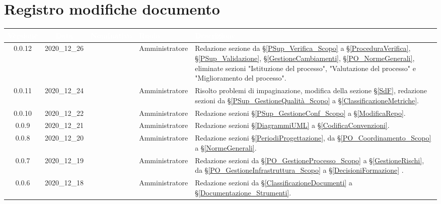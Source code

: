 \section*{Registro modifiche documento}
{
\renewcommand{\arraystretch}{1.5}
\centering
\begin{longtable}{ c c  C{2.3cm} C{3cm} C{3.2cm}}


 \textcolor{white}{\textbf{Versione}}&
    \textcolor{white}{\textbf{Data}}&
    \textcolor{white}{\textbf{Nominativo}}&
    \textcolor{white}{\textbf{Ruolo}}&
    \textcolor{white}{\textbf{Descrizione}}\\	
    \endhead
    
      0.0.12 & 2020\_12\_26 & \TG{}  & Amministratore & Redazione sezione da \S\ref{PSup_Verifica_Scopo} a \S\ref{ProceduraVerifica}, \S\ref{PSup_Validazione}, \S\ref{GestioneCambiamenti}, \S\ref{PO_NormeGenerali}, eliminate sezioni "Istituzione del processo", "Valutazione del processo" e "Miglioramento del processo". \\
    
     0.0.11 & 2020\_12\_24 & \TG{}  & Amministratore & Risolto problemi di impaginazione, modifica della sezione \S\ref{SdF}, redazione sezioni da \S\ref{PSup_GestioneQualità_Scopo} a \S\ref{ClassificazioneMetriche}. \\
    
     0.0.10 & 2020\_12\_22 & \TG{}  & Amministratore & Redazione sezioni \S\ref{PSup_GestioneConf_Scopo} a \S\ref{ModificaRepo}. \\
    
    0.0.9 & 2020\_12\_21 & \TG{}  & Amministratore & Redazione sezioni \S\ref{DiagrammiUML} a \S\ref{CodificaConvenzioni}. \\
    
    0.0.8 & 2020\_12\_20 & \TG{}  & Amministratore & Redazione sezioni \S\ref{PeriodiProgettazione}, da \S\ref{PO_Coordinamento_Scopo} a \S\ref{NormeGenerali}. \\
    
     0.0.7 & 2020\_12\_19 & \TG{}  & Amministratore & Redazione sezioni da \S\ref{PO_GestioneProcesso_Scopo} a \S\ref{GestioneRischi}, da \S\ref{PO_GestioneInfrastruttura_Scopo} a \S\ref{DecisioniFormazione} . \\
    
    0.0.6 & 2020\_12\_18 & \TG{}  & Amministratore & Redazione sezioni da \S\ref{ClassificazioneDocumenti} a \S\ref{Documentazione_Strumenti}. \\
    

\end{longtable}}
